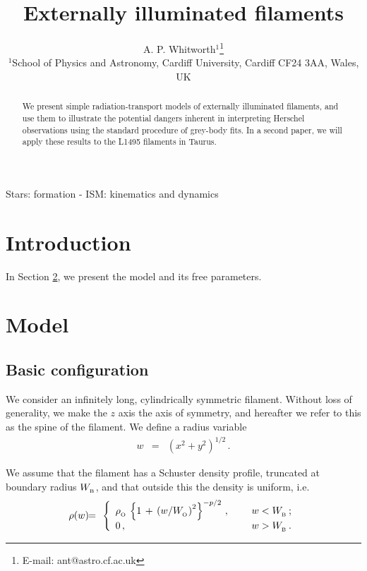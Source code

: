 \documentclass[usenatbib]{mn2e}
\title[Externally illuminated filaments]{Externally illuminated filaments}
\author[A. P. Whitworth]
{A. P. Whitworth$^{1}$\thanks{E-mail: ant@astro.cf.ac.uk} \\
$^{1}$School of Physics and Astronomy, Cardiff University, Cardiff CF24 3AA, Wales, UK}
\newcommand{\subB}{_{_{\rm B}}}
\newcommand{\subO}{_{_{\rm O}}}
\numberwithin{equation}{section}
\begin{document}
\pagerange{\pageref{firstpage}--\pageref{lastpage}} 
\maketitle
\label{firstpage}

\begin{abstract} 
We present simple radiation-transport models of externally illuminated filaments, and use them to illustrate the potential dangers inherent in interpreting Herschel observations using the standard procedure of grey-body fits. In a second paper, we will apply these results to the L1495 filaments in Taurus.
\end{abstract}

\begin{keywords}
Stars: formation - ISM: kinematics and dynamics
\end{keywords}

\section{Introduction}

In Section \ref{SEC:Model}, we present the model and its free parameters.

\section{Model}\label{SEC:Model}

\subsection{Basic configuration}

We consider an infinitely long, cylindrically symmetric filament. Without loss of generality, we make the $z$ axis the axis of symmetry, and hereafter we refer to this as the spine of the filament. We define a radius variable
\begin{eqnarray}
w&=&\left(x^2+y^2\right)^{1/2}\,.
\end{eqnarray}

We assume that the filament has a Schuster density profile, truncated at boundary radius $W\subB$, and that outside this the density is uniform, i.e.
\begin{eqnarray}
\rho(w)\!&\!=\!&\!\left\{\begin{array}{ll}
\rho\subO\,\left\{1\,+\,\left(w/W\subO\right)^2\right\}^{-p/2}\,,\hspace{0.5cm}&w<W\subB\,;\\
0\,,&w>W\subB\,.\\
\end{array}\right.
\end{eqnarray}
\end{document}
